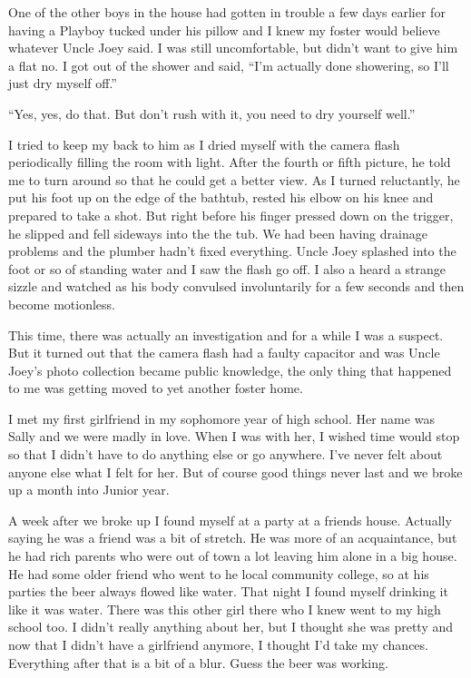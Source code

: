 \documentclass[11pt,letterpaper]{article}
\begin{document}
One of the other boys in the house had gotten in trouble a few days earlier for having a Playboy tucked under his pillow and I knew my foster would believe whatever Uncle Joey said. I was still uncomfortable, but didn't want to give him a flat no. I got out of the shower and said, ``I'm actually done showering, so I'll just dry myself off.''

``Yes, yes, do that. But don't rush with it, you need to dry yourself well.''

I tried to keep my back to him as I dried myself with the camera flash periodically filling the room with light. After the fourth or fifth picture, he told me to turn around so that he could get a better view. As I turned reluctantly, he put his foot up on the edge of the bathtub, rested his elbow on his knee and prepared to take a shot. But right before his finger pressed down on the trigger, he slipped and fell sideways into the the tub. We had been having drainage problems and the plumber hadn't fixed everything. Uncle Joey splashed into the foot or so of standing water and I saw the flash go off. I also a heard a strange sizzle and watched as his body convulsed involuntarily for a few seconds and then become motionless.

This time, there was actually an investigation and for a while I was a suspect. But it turned out that the camera flash had a faulty capacitor and was Uncle Joey's photo collection became public knowledge, the only thing that happened to me was getting moved to yet another foster home.

I met my first girlfriend in my sophomore year of high school. Her name was Sally and we were madly in love. When I was with her, I wished time would stop so that I didn't have to do anything else or go anywhere. I've never felt about anyone else what I felt for her. But of course good things never last and we broke up a month into Junior year.

A week after we broke up I found myself at a party at a friends house. Actually saying he was a friend was a bit of stretch. He was more of an acquaintance, but he had rich parents who were out of town a lot leaving him alone in a big house. He had some older friend who went to he local community college, so at his parties the beer always flowed like water. That night I found myself drinking it like it was water. There was this other girl there who I knew went to my high school too. I didn't really anything about her, but I thought she was pretty and now that I didn't have a girlfriend anymore, I thought I'd take my chances. Everything after that is a bit of a blur. Guess the beer was working.
\end{document}
